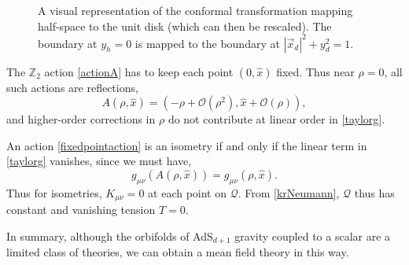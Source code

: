 \documentclass[reprint,amsmath,amssymb,aps,nofootinbib,twocolumn]{revtex4-2}
\begin{document}
\begin{appendix}
\begin{figure}

\caption{A visual representation of the conformal transformation mapping half-space to the unit disk (which can then be rescaled). The boundary at $y_h = 0$ is mapped to the boundary at $|\vec{x}_d|^2 + y_d^2 = 1$.}
\label{figs:confHalfToDisk}
\end{figure}


The $ \mathbb{Z}_2 $ action \eqref{actionA} has to keep each point $ (0,\hat{x}) $ fixed. Thus near $ \rho = 0 $, all such actions are reflections,
\begin{equation}
A(\rho,\hat{x}) =  (-\rho + \mathcal{O}(\rho^{2}),\hat{x} + \mathcal{O}(\rho)),
\label{fixedpointaction}
\end{equation}
and higher-order corrections in $\rho$ do not contribute at linear order in \eqref{taylorg}.

An action \eqref{fixedpointaction} is an isometry if and only if the linear term in \eqref{taylorg} vanishes, since we must have,
\begin{equation}
g_{\mu\nu}\left(A(\rho,\hat{x})\right) = g_{\mu\nu}(\rho,\hat{x}).
\end{equation}
Thus for isometries, $ K_{\mu\nu} = 0 $ at each point on $ \mathcal{Q} $. From \eqref{krNeumann}, $\mathcal{Q}$ thus has constant and vanishing tension $ T = 0 $.%

In summary, although the orbifolds of AdS$_{d+1}$ gravity coupled to a scalar are a limited class of theories, we can obtain a mean field theory in this way.



\end{appendix}
\end{document}
